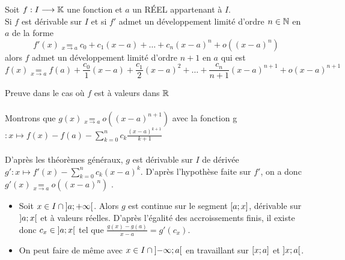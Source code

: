 \begin{theo}
    Soit \(f : I \longrightarrow  \mathbb{K}\) une fonction et \(a\) un RÉEL appartenant à \(I\).\\
    Si \(f\) est dérivable sur \(I\) et si \(f '\) admet un développement limité d’ordre \(n \in  \mathbb{N}\) en \(a\) de la forme
    \[f '(x) \underset{x\to a}{=} c_0 + c_1(x - a) + \dots + c_n(x - a)^n + o ((x - a)^n)\]
    alors \(f\) admet un développement limité d’ordre \(n + 1\) en \(a\) qui est
    \[f (x) \underset{x\to a}{=} f (a) + \frac{c_0}{1} (x - a) + \frac{c_1}{2} (x - a)^2 + \dots + \frac{c_n}{n + 1}(x - a)^{n+1} + o (x - a)^{n+1}\]
\end{theo}

\begin{dem}
    Preuve dans le cas où \(f\) est à valeurs dans \(\mathbb{R}\)\\~\\
    Montrons que \(g(x) \underset{x \to a}{=} o ((x - a)^{n+1})\) avec la fonction g\( : x \mapsto f (x) - f (a) -\sum^n_{k=0}c_k \frac{(x - a)^{k+1}}{k + 1}\)\\~\\
    D’après les théorèmes généraux, \(g\) est dérivable sur \(I\) de dérivée \(g' : x \mapsto f '(x) -\sum^n_{k=0}c_k(x - a)^k.\)
    D’après l’hypothèse faite sur \(f '\), on a donc \(g'(x) \underset{x \to a}{=} o ((x - a)^n)\) . 
    \begin{itemize}
        \item Soit \(x \in I \cap \left]a;+\infty\right[\). Alors \(g\) est continue sur le segment \(\left[a;x\right]\), dérivable sur \(\left]a;x\right[\) et à valeurs réelles. D’après l’égalité des accroissements finis, il existe donc \(c_x \in \left]a;x\right[\) tel que \(\frac{g(x) - g(a)}{x - a} = g' (c_x)\).
        \item On peut faire de même avec \(x \in I \cap \left]-\infty;a\right[\) en travaillant sur \(\left[x;a\right]\) et \(\left]x;a\right[\).
    \end{itemize}


\end{dem}
